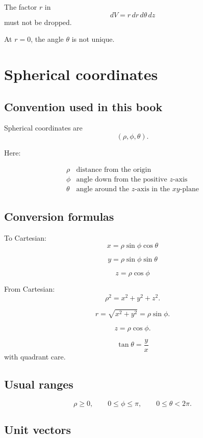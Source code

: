 The factor \(r\) in
\[
    dV=r\,dr\,d\theta\,dz
\]
must not be dropped.

At \(r=0\), the angle \(\theta\) is not unique.

\section{Spherical coordinates}
\label{app:D.3}

\subsection*{Convention used in this book}

Spherical coordinates are
\[
\boxed{
    (\rho,\phi,\theta).
}
\]

Here:

\[
\begin{array}{c|c}
\rho & \text{distance from the origin}\\[1mm]
\phi & \text{angle down from the positive }z\text{-axis}\\[1mm]
\theta & \text{angle around the }z\text{-axis in the }xy\text{-plane}
\end{array}
\]

\subsection*{Conversion formulas}

To Cartesian:
\[
\boxed{
    x=\rho\sin\phi\cos\theta
}
\]

\[
\boxed{
    y=\rho\sin\phi\sin\theta
}
\]

\[
\boxed{
    z=\rho\cos\phi
}
\]

From Cartesian:
\[
\boxed{
    \rho^2=x^2+y^2+z^2.
}
\]

\[
\boxed{
    r=\sqrt{x^2+y^2}=\rho\sin\phi.
}
\]

\[
\boxed{
    z=\rho\cos\phi.
}
\]

\[
\boxed{
    \tan\theta=\frac yx
}
\]
with quadrant care.

\subsection*{Usual ranges}

\[
\boxed{
    \rho\ge0,
    \qquad
    0\le\phi\le\pi,
    \qquad
    0\le\theta<2\pi.
}
\]

\subsection*{Unit vectors}

